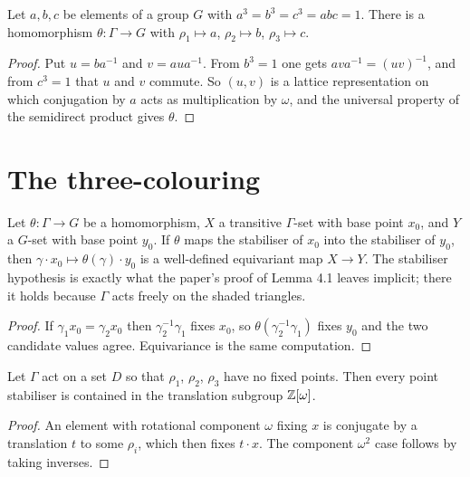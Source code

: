 \begin{proposition}\label{prop:theta}
  \leanok
  Let $a, b, c$ be elements of a group $G$ with
  $a^3 = b^3 = c^3 = abc = 1$. There is a homomorphism
  $\theta \colon \Gamma \to G$ with $\rho_1 \mapsto a$, $\rho_2 \mapsto b$,
  $\rho_3 \mapsto c$.
\end{proposition}
\begin{proof}\leanok
  Put $u = ba^{-1}$ and $v = aua^{-1}$. From $b^3 = 1$ one gets
  $ava^{-1} = (uv)^{-1}$, and from $c^3 = 1$ that $u$ and $v$ commute.
  So $(u, v)$ is a lattice representation on which conjugation by $a$
  acts as multiplication by $\omega$, and the universal property of the
  semidirect product gives $\theta$.
\end{proof}

\chapter{The three-colouring}

\begin{lemma}\label{lem:orbit-map}
  \leanok
  Let $\theta \colon \Gamma \to G$ be a homomorphism, $X$ a transitive
  $\Gamma$-set with base point $x_0$, and $Y$ a $G$-set with base point
  $y_0$. If $\theta$ maps the stabiliser of $x_0$ into the stabiliser of
  $y_0$, then $\gamma \cdot x_0 \mapsto \theta(\gamma) \cdot y_0$ is a
  well-defined equivariant map $X \to Y$.
  The stabiliser hypothesis is exactly what the paper's proof of Lemma 4.1
  leaves implicit; there it holds because $\Gamma$ acts freely on the
  shaded triangles.
\end{lemma}
\begin{proof}\leanok
  If $\gamma_1 x_0 = \gamma_2 x_0$ then $\gamma_2^{-1}\gamma_1$ fixes
  $x_0$, so $\theta(\gamma_2^{-1}\gamma_1)$ fixes $y_0$ and the two
  candidate values agree. Equivariance is the same computation.
\end{proof}

\begin{lemma}\label{lem:stabilizer}
  \leanok
  Let $\Gamma$ act on a set $D$ so that $\rho_1$, $\rho_2$, $\rho_3$ have
  no fixed points. Then every point stabiliser is contained in the
  translation subgroup $\mathbb{Z}[\omega]$.
\end{lemma}
\begin{proof}\leanok
  An element with rotational component $\omega$ fixing $x$ is conjugate
  by a translation $t$ to some $\rho_i$, which then fixes $t \cdot x$.
  The component $\omega^2$ case follows by taking inverses.
\end{proof}

